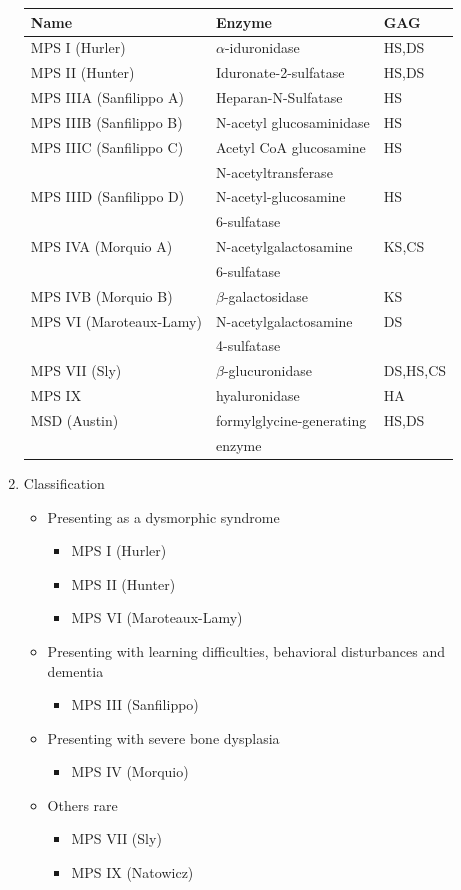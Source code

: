 \documentclass{scrartcl}
\begin{document}
\begin{enumerate}
\small
\begin{center}
\begin{tabular}{lll}
Name & Enzyme & GAG\\
\hline
MPS I (Hurler) & \(\alpha\)-iduronidase & HS,DS\\
MPS II (Hunter) & Iduronate-2-sulfatase & HS,DS\\
\hline
MPS IIIA (Sanfilippo A) & Heparan-N-Sulfatase & HS\\
MPS IIIB (Sanfilippo B) & N-acetyl glucosaminidase & HS\\
MPS IIIC (Sanfilippo C) & Acetyl CoA glucosamine & HS\\
 & N-acetyltransferase & \\
MPS IIID (Sanfilippo D) & N-acetyl-glucosamine & HS\\
 & 6-sulfatase & \\
\hline
MPS IVA (Morquio A) & N-acetylgalactosamine & KS,CS\\
 & 6-sulfatase & \\
MPS IVB (Morquio B) & \(\beta\)-galactosidase & KS\\
\hline
MPS VI (Maroteaux-Lamy) & N-acetylgalactosamine & DS\\
 & 4-sulfatase & \\
MPS VII (Sly) & \(\beta\)-glucuronidase & DS,HS,CS\\
MPS IX & hyaluronidase & HA\\
MSD (Austin) & formylglycine-generating & HS,DS\\
 & enzyme & \\
\end{tabular}
\end{center}



\item Classification
\label{sec:orgee30763}
\begin{itemize}
\item Presenting as a dysmorphic syndrome
\begin{itemize}
\item MPS I (Hurler)
\item MPS II (Hunter)
\item MPS VI (Maroteaux-Lamy)
\end{itemize}
\item Presenting with learning difficulties, behavioral disturbances and dementia
\begin{itemize}
\item MPS III (Sanfilippo)
\end{itemize}
\item Presenting with severe bone dysplasia
\begin{itemize}
\item MPS IV (Morquio)
\end{itemize}
\item Others rare
\begin{itemize}
\item MPS VII (Sly)
\item MPS IX (Natowicz)
\end{itemize}
\end{itemize}




\end{enumerate}
\end{document}
